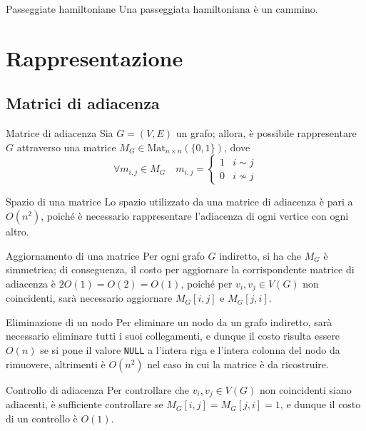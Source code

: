 \documentclass[a4paper, 12pt]{report}
\begin{document}
    \begin{framedobs}{Passeggiate hamiltoniane}
        Una passeggiata hamiltoniana è un cammino.
    \end{framedobs}

    \section{Rappresentazione}

    \subsection{Matrici di adiacenza}

    \begin{frameddefn}{Matrice di adiacenza}
        Sia $G = (V, E)$ un grafo; allora, è possibile rappresentare $G$ attraverso una matrice $M_G \in \textrm{Mat}_{n \times n}(\{0, 1\})$, dove $$\forall m_{i, j} \in M_G \quad m_{i, j} = \left \{ \begin{array}{ll} 1 & i \sim j\\ 0 & i \nsim j \end{array} \right.$$
    \end{frameddefn}

    \begin{framedobs}{Spazio di una matrice}
        Lo spazio utilizzato da una matrice di adiacenza è pari a $O(n^2)$, poiché è necessario rappresentare l'adiacenza di ogni vertice con ogni altro.
    \end{framedobs}

    \begin{framedobs}{Aggiornamento di una matrice}
        Per ogni grafo $G$ indiretto, si ha che $M_G$ è simmetrica; di conseguenza, il costo per aggiornare la corrispondente matrice di adiacenza è $2 O(1)= O(2) = O(1)$, poiché per $v_i, v_j \in V(G)$ non coincidenti, sarà necessario aggiornare $M_G[i, j]$ e $M_G[j, i]$.
    \end{framedobs}

    \begin{framedobs}{Eliminazione di un nodo}
        Per eliminare un nodo da un grafo indiretto, sarà necessario eliminare tutti i suoi collegamenti, e dunque il costo risulta essere $O(n)$ se si pone il valore \texttt{NULL} a l'intera riga e l'intera colonna del nodo da rimuovere, altrimenti è $O(n^2)$ nel caso in cui la matrice è da ricostruire.
    \end{framedobs}

    \begin{framedobs}{Controllo di adiacenza}
        Per controllare che $v_i, v_j \in V(G)$ non coincidenti siano adiacenti, è sufficiente controllare se $M_G[i, j] = M_G[j, i] = 1$, e dunque il costo di un controllo è $O(1)$.
    \end{framedobs}
\end{document}
